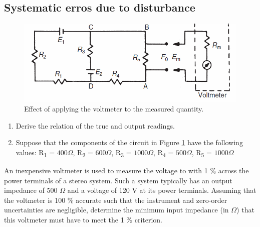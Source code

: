\documentclass[a4paper,11pt]{book}
\begin{document}
\subsection*{Systematic erros due to disturbance}
\begin{question}[subtitle=System Disturbance]
\begin{figure}[h!]\label{fig:systematic_error_circuit}
\centering
  \includegraphics[width=0.8\linewidth]{systematic_error_circuit}
  \caption{Effect of applying the voltmeter to the measured quantity.} 
\end{figure}
\begin{enumerate}
\item Derive the relation of the true and output readings.
\item Suppose that the components of the circuit in Figure \ref{fig:systematic_error_circuit} have the following values:
 R\textsubscript{1} = $400\Omega$, R\textsubscript{2} = $600\Omega$, R\textsubscript{3} = $1000\Omega$, R\textsubscript{4} = $500\Omega$, R\textsubscript{5} = $1000\Omega$
\end{enumerate}
\examspace*{15em}

\end{question}
\begin{solution}


\end{solution}


\begin{question}
An inexpensive voltmeter is used to measure the voltage to with 1 \%
across the power terminals of a stereo system. Such a system typically has
an output impedance of 500 $\Omega$ and a voltage of 120 V at its power terminals.
Assuming that the voltmeter is 100 \% accurate such that the instrument and
zero-order uncertainties are negligible, determine the minimum input impedance
(in $\Omega$) that this voltmeter must have to meet the 1 \% criterion.

\examspace*{15em}

\end{question}
\begin{solution}


\end{solution}
\end{document}
